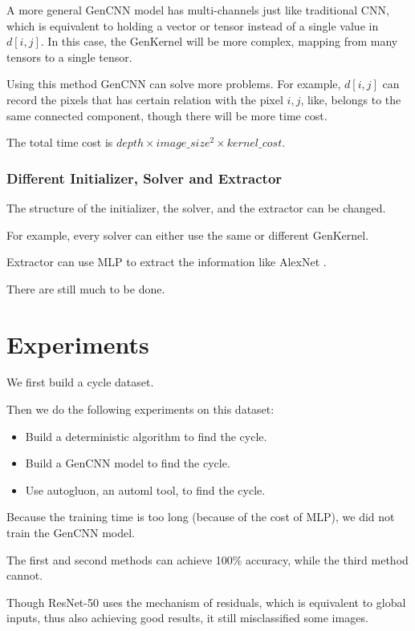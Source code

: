 \documentclass{article}
\begin{document}
A more general GenCNN model has multi-channels just like traditional CNN, which is equivalent to holding a vector or tensor instead of a single value in $d[i,j]$. 
In this case, the GenKernel will be more complex, mapping from many tensors to a single tensor. 

Using this method GenCNN can solve more problems. For example, $d[i,j]$ can record the pixels that has certain relation with the pixel $i,j$, 
like, belongs to the same connected component, though there will be more time cost.

The total time cost is $depth\times image\_size^2 \times kernel\_cost$.

\subsubsection{Different Initializer, Solver and Extractor}

The structure of the initializer, the solver, and the extractor can be changed. 

For example, every solver can either use the same or different GenKernel.

Extractor can use MLP to extract the information like AlexNet \cite{krizhevsky2012imagenet}.

There are still much to be done.

\section{Experiments}

We first build a cycle dataset.

Then we do the following experiments on this dataset:

\begin{itemize}
    \item Build a deterministic algorithm to find the cycle.
    \item Build a GenCNN model to find the cycle.
    \item Use autogluon, an automl tool, to find the cycle.
\end{itemize}



Because the training time is too long (because of the cost of MLP), we did not train the GenCNN model.

The first and second methods can achieve 100\% accuracy, while the third method cannot.

Though ResNet-50 uses the mechanism of residuals, which is equivalent to global inputs, thus also achieving good results, 
it still misclassified some images.
\end{document}
